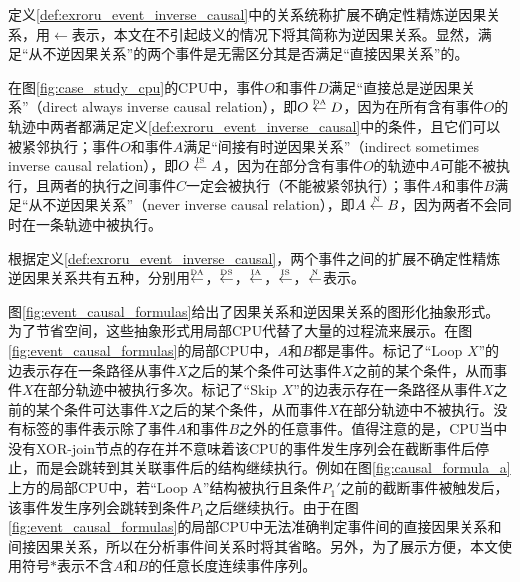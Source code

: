定义\ref{def:exroru_event_inverse_causal}中的关系统称扩展不确定性精炼逆因果关系，用$\leftarrow$表示，本文在不引起歧义的情况下将其简称为逆因果关系。显然，满足“从不逆因果关系”的两个事件是无需区分其是否满足“直接因果关系”的。

\begin{example}\label{ex:exroru_event_inverse_causal}
在图\ref{fig:case_study_cpu}的CPU中，事件$O$和事件$D$满足“直接总是逆因果关系”（direct always inverse causal relation），即$O\overset{\text{\tiny{DA}}}{\leftarrow}D$，因为在所有含有事件$O$的轨迹中两者都满足定义\ref{def:exroru_event_inverse_causal}中的条件，且它们可以被紧邻执行；事件$O$和事件$A$满足“间接有时逆因果关系”（indirect sometimes inverse causal relation），即$O\overset{\text{\tiny{IS}}}{\leftarrow}A$，因为在部分含有事件$O$的轨迹中$A$可能不被执行，且两者的执行之间事件$C$一定会被执行（不能被紧邻执行）；事件$A$和事件$B$满足“从不逆因果关系”（never inverse causal relation），即$A\overset{\text{\tiny{N}}}{\leftarrow}B$，因为两者不会同时在一条轨迹中被执行。
\end{example}

根据定义\ref{def:exroru_event_inverse_causal}，两个事件之间的扩展不确定性精炼逆因果关系共有五种，分别用$\overset{\text{\tiny{DA}}}{\leftarrow}$，$\overset{\text{\tiny{DS}}}{\leftarrow}$，$\overset{\text{\tiny{IA}}}{\leftarrow}$，$\overset{\text{\tiny{IS}}}{\leftarrow}$，$\overset{\text{\tiny{N}}}{\leftarrow}$表示。

图\ref{fig:event_causal_formulas}给出了因果关系和逆因果关系的图形化抽象形式。为了节省空间，这些抽象形式用局部CPU代替了大量的过程流来展示。在图\ref{fig:event_causal_formulas}的局部CPU中，$A$和$B$都是事件。标记了“Loop $X$”的边表示存在一条路径从事件$X$之后的某个条件可达事件$X$之前的某个条件，从而事件$X$在部分轨迹中被执行多次。标记了“Skip $X$”的边表示存在一条路径从事件$X$之前的某个条件可达事件$X$之后的某个条件，从而事件$X$在部分轨迹中不被执行。没有标签的事件表示除了事件$A$和事件$B$之外的任意事件。值得注意的是，CPU当中没有XOR-join节点的存在并不意味着该CPU的事件发生序列会在截断事件后停止，而是会跳转到其关联事件后的结构继续执行。例如在图\ref{fig:causal_formula_a}上方的局部CPU中，若“Loop A”结构被执行且条件$P_{1}'$之前的截断事件被触发后，该事件发生序列会跳转到条件$P_{1}$之后继续执行。由于在图\ref{fig:event_causal_formulas}的局部CPU中无法准确判定事件间的直接因果关系和间接因果关系，所以在分析事件间关系时将其省略。另外，为了展示方便，本文使用符号$*$表示不含$A$和$B$的任意长度连续事件序列。

